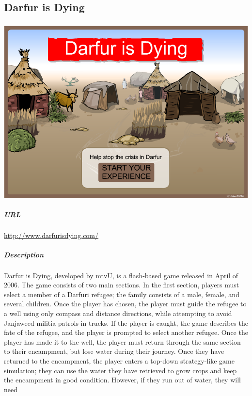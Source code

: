 \subsection{Darfur is Dying}\subparagraph{}\includegraphics[width = \textwidth]{img/darfur_title.png}\subparagraph{URL}\url{http://www.darfurisdying.com/}\subparagraph{Description}Darfur is Dying, developed by mtvU, is a flash-based game released in April of 2006. The game consists of two main sections. In the first section, players must select a member of a Darfuri refugee; the family consists of a male, female, and several children. Once the player has chosen, the player must guide the refugee to a well using only compass and distance directions, while attempting to avoid Janjaweed militia patrols in trucks. If the player is caught, the game describes the fate of the refugee, and the player is prompted to select another refugee. Once the player has made it to the well, the player must return through the same section to their encampment, but lose water during their journey. Once they have returned to the encampment, the player enters a top-down strategy-like game simulation; they can use the water they have retrieved to grow crops and keep the encampment in good condition. However, if they run out of water, they will need 